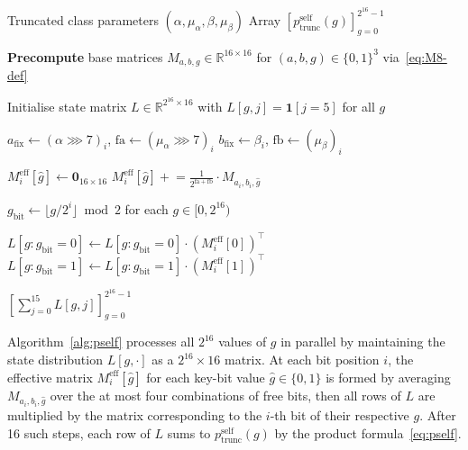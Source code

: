 \documentclass[runningheads]{llncs}
\newcommand{\pself}{p^{\mathrm{self}}_{\mathrm{trunc}}}
\begin{document}
\begin{algorithm}[t]
\caption{Compute $\pself(g)$ for all $g \in \{0,1\}^{16}$}
\label{alg:pself}
\begin{algorithmic}[1]
\Require Truncated class parameters $(\alpha, \mu_\alpha, \beta, \mu_\beta)$
\Ensure Array $[\pself(g)]_{g=0}^{2^{16}-1}$

\State \textbf{Precompute} base matrices $M_{a,b,g} \in \mathbb{R}^{16 \times 16}$
       for $(a,b,g) \in \{0,1\}^3$ via~\eqref{eq:M8-def}

\State Initialise state matrix
       $L \in \mathbb{R}^{2^{16} \times 16}$ with $L[g, j] = \mathbf{1}[j = 5]$
       for all $g$ 

  \State $a_{\mathrm{fix}} \gets (\alpha \ggg 7)_i$,\quad
         $\mathrm{fa} \gets (\mu_\alpha \ggg 7)_i$ 
  \State $b_{\mathrm{fix}} \gets \beta_i$,\quad
         $\mathrm{fb} \gets (\mu_\beta)_i$

   
    \State $M^{\mathrm{eff}}_i[\hat{g}] \gets \mathbf{0}_{16 \times 16}$
      \State $M^{\mathrm{eff}}_i[\hat{g}] \mathrel{+}=
             \tfrac{1}{2^{\mathrm{fa}+\mathrm{fb}}} \cdot M_{a_i, b_i, \hat{g}}$
    \EndFor
  \EndFor

  \State $g_{\mathrm{bit}} \gets \lfloor g / 2^i \rfloor \bmod 2$
         \quad for each $g \in [0, 2^{16})$

  \State $L[g \colon g_{\mathrm{bit}}=0] \mathrel{\gets}
         L[g \colon g_{\mathrm{bit}}=0]\cdot (M^{\mathrm{eff}}_i[0])^\top$ 
  \State $L[g \colon g_{\mathrm{bit}}=1] \mathrel{\gets}
         L[g \colon g_{\mathrm{bit}}=1]\cdot (M^{\mathrm{eff}}_i[1])^\top$
\EndFor

\Return $[\textstyle\sum_{j=0}^{15} L[g,j]]_{g=0}^{2^{16}-1}$
\end{algorithmic}
\end{algorithm}

Algorithm~\ref{alg:pself} processes all $2^{16}$ values of $g$ in
parallel by maintaining the state distribution $L[g, \cdot]$ as a
$2^{16} \times 16$ matrix.  At each bit position $i$, the effective
matrix $M^{\mathrm{eff}}_i[\hat{g}]$ for each key-bit value
$\hat{g} \in \{0,1\}$ is formed by averaging $M_{a_i, b_i, \hat{g}}$
over the at most four combinations of free bits, then all rows of $L$
are multiplied by the matrix corresponding to the $i$-th bit of their
respective $g$.  After 16 such steps, each row of $L$ sums to
$\pself(g)$ by the product formula~\eqref{eq:pself}.
\end{document}
